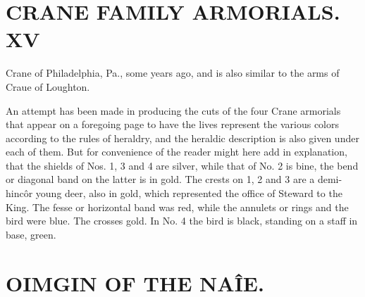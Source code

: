 \chapter{CRANE FAMILY ARMORIALS. XV}
Crane of Philadelphia, Pa., some years ago, and is also similar 
to the arms of Craue of Loughton. 

An attempt has been made in producing the cuts of the four 
Crane armorials that appear on a foregoing page to have the lives 
represent the various colors according to the rules of heraldry, 
and the heraldic description is also given under each of them. 
But for convenience of the reader might here add in explanation, 
that the shields of Nos. 1, 3 and 4 are silver, while that of No. 
2 is bine, the bend or diagonal band on the latter is in gold. 
The crests on 1, 2 and 3 are a demi-hinc\^ or young deer, also in 
gold, which represented the office of Steward to the King. The 
fesse or horizontal band was red, while the annulets or rings and 
the bird were blue. The crosses gold. In No. 4 the bird is 
black, standing on a staff in base, green. 



\chapter{OIMGIN OF THE NA\^IE.}


